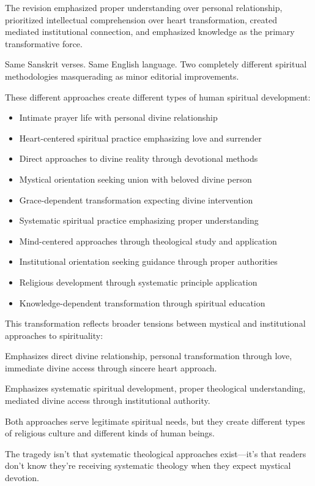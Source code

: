 \documentclass[12pt,twoside]{book}
\begin{document}
The revision emphasized proper understanding over personal relationship, prioritized intellectual comprehension over heart transformation, created mediated institutional connection, and emphasized knowledge as the primary transformative force.

Same Sanskrit verses. Same English language. Two completely different spiritual methodologies masquerading as minor editorial improvements.

These different approaches create different types of human spiritual development:

\begin{itemize}
\item Intimate prayer life with personal divine relationship
\item Heart-centered spiritual practice emphasizing love and surrender
\item Direct approaches to divine reality through devotional methods
\item Mystical orientation seeking union with beloved divine person
\item Grace-dependent transformation expecting divine intervention

\item Systematic spiritual practice emphasizing proper understanding
\item Mind-centered approaches through theological study and application
\item Institutional orientation seeking guidance through proper authorities
\item Religious development through systematic principle application
\item Knowledge-dependent transformation through spiritual education
\end{itemize}

This transformation reflects broader tensions between mystical and institutional approaches to spirituality:

Emphasizes direct divine relationship, personal transformation through love, immediate divine access through sincere heart approach.

Emphasizes systematic spiritual development, proper theological understanding, mediated divine access through institutional authority.

Both approaches serve legitimate spiritual needs, but they create different types of religious culture and different kinds of human beings.

The tragedy isn't that systematic theological approaches exist—it's that readers don't know they're receiving systematic theology when they expect mystical devotion.
\end{document}
